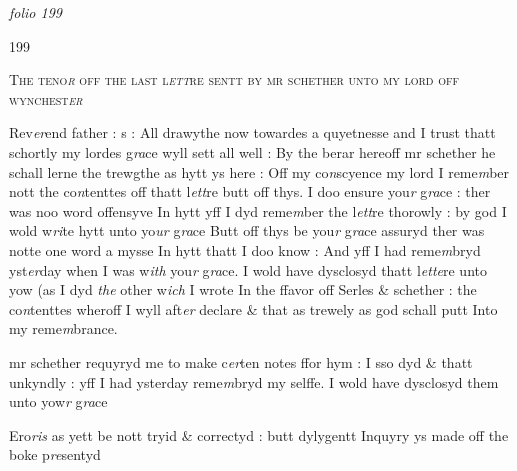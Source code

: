 \documentclass[12pt, a4paper]{book}
\begin{document}
\textit{folio 199}
      				
      				
      				\begin{flushright}{\color{Mahogany}199}\end{flushright}
      				
				\begin{center} \begin{large} {\scshape The teno\textit{r} off the last l\textit{ett}re sentt by mr schether unto my lord off wynchest\textit{er}} \end{large} \end{center}
			
      				
		\ifthenelse{\isodd{\thepage}}
		{\reversemarginpar}
		{\normalmarginpar}
		Rev\textit{er}end father : s : All drawythe now towardes a quyetnesse and I trust thatt schortly my lordes g\textit{ra}ce wyll sett all well : By the berar hereoff mr schether he schall lerne the trewgthe as hytt ys here : Off my co\textit{n}scyence my lord I reme\textit{m}ber nott the co\textit{n}tenttes off thatt l\textit{ett}re butt off thys. I doo ensure you\textit{r} g\textit{ra}ce : ther was noo word offensyve In hytt yff I dyd reme\textit{m}ber the l\textit{ett}re thorowly : by god I wold w\textit{ri}te hytt unto yo\textit{ur} g\textit{ra}ce Butt off thys be you\textit{r} g\textit{ra}ce assuryd ther was notte one word a mysse In hytt thatt I doo know : And yff I had reme\textit{m}bryd yst\textit{er}day when I was w\textit{ith} you\textit{r} g\textit{ra}ce. I wold have dysclosyd thatt l\textit{ette}re unto yow (as I dyd \textit{the} other w\textit{ich} I wrote In the ffavor off Serles \& schether : the co\textit{n}tenttes wheroff I wyll aft\textit{er} declare \& that as trewely as god schall putt Into my reme\textit{m}brance.
      				
		\ifthenelse{\isodd{\thepage}}
		{\reversemarginpar}
		{\normalmarginpar}
		mr schether requyryd me to make c\textit{er}ten notes ffor hym : I sso dyd \& thatt unkyndly : yff I had ysterday reme\textit{m}bryd my selffe. I wold have dysclosyd them unto yow\textit{r} g\textit{ra}ce

				\marginpar[\vspace{0.5cm}{\textcolor{Gray}{1}}]{}
			

		\ifthenelse{\isodd{\thepage}}
		{\reversemarginpar}
		{\normalmarginpar}
		Ero\textit{ris} as yett be nott tryid \& correctyd : butt dylygentt Inquyry ys made off the boke p\textit{re}sentyd

				\marginpar[\vspace{0.5cm}{\textcolor{Gray}{2}}]{}
			
\end{document}
